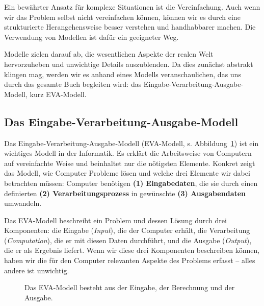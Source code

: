 \documentclass[
  ngerman,
  letterpaper,
  DIV=11]{scrreprt}
\begin{document}
Ein bewährter Ansatz für komplexe Situationen ist die Vereinfachung.
Auch wenn wir das Problem selbst nicht vereinfachen können, können wir
es durch eine strukturierte Herangehensweise besser verstehen und
handhabbarer machen. Die Verwendung von Modellen ist dafür ein
geeigneter Weg.

Modelle zielen darauf ab, die wesentlichen Aspekte der realen Welt
hervorzuheben und unwichtige Details auszublenden. Da dies zunächst
abstrakt klingen mag, werden wir es anhand eines Modells
veranschaulichen, das uns durch das gesamte Buch begleiten wird: das
Eingabe-Verarbeitung-Ausgabe-Modell, kurz EVA-Modell.

\subsection{Das
Eingabe-Verarbeitung-Ausgabe-Modell}\label{das-eingabe-verarbeitung-ausgabe-modell}

Das Eingabe-Verarbeitung-Ausgabe-Modell (EVA-Modell, s.
Abbildung~\ref{fig-input-computation-output}) ist ein wichtiges Modell
in der Informatik. Es erklärt die Arbeitsweise von Computern auf
vereinfachte Weise und beinhaltet nur die nötigsten Elemente. Konkret
zeigt das Modell, wie Computer Probleme lösen und welche drei Elemente
wir dabei betrachten müssen: Computer benötigen \textbf{(1)
Eingabedaten}, die sie durch einen definierten \textbf{(2)
Verarbeitungsprozess} in gewünschte \textbf{(3) Ausgabendaten}
umwandeln.

Das EVA-Modell beschreibt ein Problem und dessen Lösung durch drei
Komponenten: die Eingabe (\emph{Input}), die der Computer erhält, die
Verarbeitung (\emph{Computation}), die er mit diesen Daten durchführt,
und die Ausgabe (\emph{Output}), die er als Ergebnis liefert. Wenn wir
diese drei Komponenten beschreiben können, haben wir die für den
Computer relevanten Aspekte des Problems erfasst -- alles andere ist
unwichtig.

\begin{figure}


\caption{\label{fig-input-computation-output}Das EVA-Modell besteht aus
der Eingabe, der Berechnung und der Ausgabe.}

\end{figure}%
\end{document}
